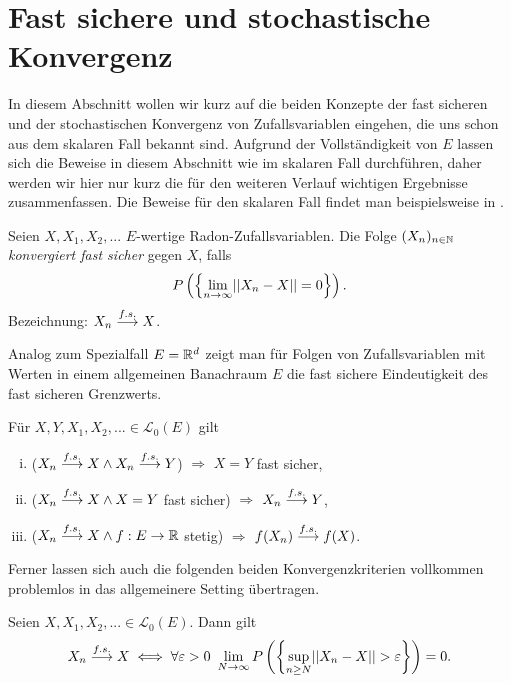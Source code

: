 \section{Fast sichere und stochastische Konvergenz}
In diesem Abschnitt wollen wir kurz auf die beiden Konzepte der fast sicheren und der stochastischen Konvergenz von Zufallsvariablen eingehen, die uns schon aus dem skalaren Fall bekannt sind. 
Aufgrund der Vollständigkeit von $E$ lassen sich die Beweise in diesem Abschnitt wie im skalaren Fall durchführen, daher werden wir hier nur kurz die für den weiteren Verlauf wichtigen Ergebnisse zusammenfassen.  
Die Beweise für den skalaren Fall findet man beispielsweise in \cite{gs}. 
\begin{mydef}
    Seien $X, X_1, X_2,...$ $E$-wertige Radon-Zufallsvariablen. Die Folge $(X_n)_{n \in \mathbb{N}}$ \textit{konvergiert fast sicher} gegen $X$, falls
    $$
        P\left(\left\{ \lim_{n \to \infty} \lvert\lvert X_n - X \rvert\rvert = 0 \right\}\right).
    $$
Bezeichnung: $X_n \overset{f.s.}{\longrightarrow} X$. 
\end{mydef}

Analog zum Spezialfall $E = \mathbb{R}^d$ zeigt man für Folgen von Zufallsvariablen mit Werten in einem allgemeinen Banachraum $E$ die fast sichere Eindeutigkeit des fast sicheren Grenzwerts. 
\begin{proposition}
    Für $X,Y,X_1,X_2,... \in \mathcal{L}_0(E)$ gilt
    \begin{enumerate}[(i)]
        \item ($X_n \overset{f.s.}{\longrightarrow} X \land X_n \overset{f.s.}{\longrightarrow} Y$) $\Rightarrow$ $ X = Y$ fast sicher, 
        \item ($X_n \overset{f.s.}{\longrightarrow} X \land X = Y$ fast sicher) $\Rightarrow$ $X_n \overset{f.s.}{\longrightarrow} Y$,
        \item ($X_n \overset{f.s.}{\longrightarrow} X \land f:E \to \mathbb{R}$ stetig) $\Rightarrow$ $f(X_n) \overset{f.s.}{\longrightarrow} f(X)$. 
    \end{enumerate}
\end{proposition}

Ferner lassen sich auch die folgenden beiden Konvergenzkriterien vollkommen problemlos in das allgemeinere Setting übertragen. 

\begin{theorem}
    Seien $X, X_1,X_2,... \in \mathcal{L}_0(E)$. Dann gilt
    \begin{align*}
        X_n \overset{f.s.}{\longrightarrow} X \iff \forall \varepsilon > 0 \ \lim_{N \to \infty}P\left(\left\{ \sup_{n \geq N}\lvert\lvert X_n - X \rvert\rvert > \varepsilon \right\}\right) = 0.
    \end{align*}
\end{theorem}

